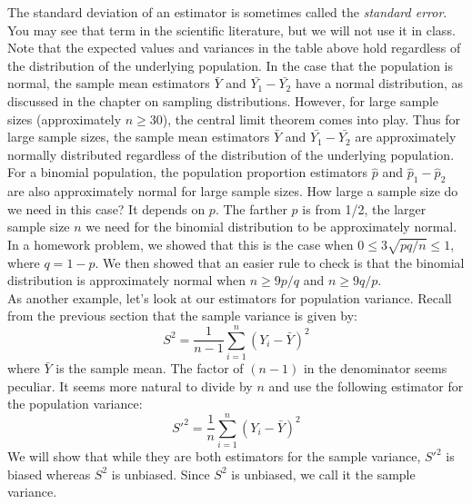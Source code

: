 \documentclass[notes.tex]{subfiles}
\begin{document}
The standard deviation of an estimator is sometimes called the \emph{standard error}. You may see that term in the scientific literature, but we will not use it in class. Note that the expected values and variances in the table above hold regardless of the distribution of the underlying population. In the case that the population is normal, the sample mean estimators $\bar{Y}$ and $\bar{Y_1} - \bar{Y_2}$ have a normal distribution, as discussed in the chapter on sampling distributions. However, for large sample sizes (approximately $n \geq 30$), the central limit theorem comes into play. Thus for large sample sizes, the sample mean estimators $\bar{Y}$ and $\bar{Y_1} - \bar{Y_2}$ are approximately normally distributed regardless of the distribution of the underlying population. For a binomial population, the population proportion estimators $\hat{p}$ and $\hat{p}_1 - \hat{p}_2$ are also approximately normal for large sample sizes. How large a sample size do we need in this case? It depends on $p$. The farther $p$ is from 1/2, the larger sample size $n$ we need for the binomial distribution to be approximately normal. In a homework problem, we showed that this is the case when $0 \leq 3 \sqrt{pq/n} \leq 1$, where $q = 1 - p$. We then showed that an easier rule to check is that the binomial distribution is approximately normal when $n \geq 9p/q$ and $n \geq 9q/p$.\\

As another example, let's look at our estimators for population variance. Recall from the previous section that the sample variance is given by:
\[
S^2 = \frac{1}{n-1} \sum_{i=1}^n (Y_i - \bar{Y})^2
\]
where $\bar{Y}$ is the sample mean. The factor of $(n-1)$ in the denominator seems peculiar. It seems more natural to divide by $n$ and use the following estimator for the population variance:
\[
S'^2 = \frac{1}{n} \sum_{i=1}^n (Y_i - \bar{Y})^2
\]
We will show that while they are both estimators for the sample variance, $S'^2$ is biased whereas $S^2$ is unbiased. Since $S^2$ is unbiased, we call it the sample variance.\\
\end{document}
